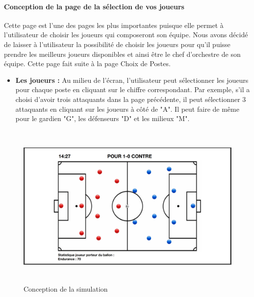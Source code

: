     \vspace{15pt}

\paragraph{Conception de la page de la sélection de vos joueurs}
    Cette page est l'une des pages les plus importantes puisque elle permet à l'utilisateur de choisir les joueurs qui composeront son équipe. Nous avons décidé de laisser à l'utilisateur la possibilité de choisir les joueurs pour qu'il puisse prendre les meilleurs joueurs disponibles et ainsi être le chef d'orchestre de son équipe. Cette page fait suite à la page Choix de Postes.

    \vspace{15pt}

\begin{itemize}
    \item \textbf{Les joueurs :} 
         Au milieu de l'écran, l'utilisateur peut sélectionner les joueurs pour chaque poste en cliquant sur le chiffre correspondant. Par exemple, s'il a choisi d'avoir trois attaquants dans la page précédente, il peut sélectionner 3 attaquants en cliquant sur les joueurs à côté de "A". Il peut faire de même pour le gardien "G", les défenseurs "D" et les milieux "M".
    \vspace{15pt}
\end{itemize}

\newpage

\begin{figure}[h]
\centering
\includegraphics[width=12.82cm, height=8.2cm]{images/ConceptIHM5.png}
\caption{Conception de la simulation }
\label{fig:match}
\end{figure}

